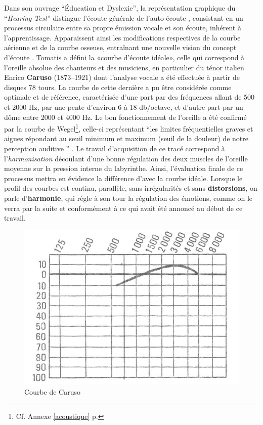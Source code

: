 Dans son ouvrage ``Éducation et
    Dyslexie''\autocite {tomatis:education}, la représentation graphique du
 ``\emph {Hearing Test}'' distingue l'écoute générale de
 l'auto-écoute \autocite {Tomatislangage}, consistant  en un processus
   circulaire entre sa propre  émission vocale et son écoute, inhérent
   à l'apprentissage.
 Apparaissent ainsi les modifications respectives
 de la courbe aérienne et de la courbe osseuse, entraînant une nouvelle vision
 du concept d'écoute \autocite {tomatis_conf}.%
       Tomatis a défini la «courbe d'écoute idéale», celle qui correspond à l'oreille absolue
des chanteurs et des musiciens, en particulier du ténor italien Enrico
\textbf{Caruso} (1873--1921) dont l'analyse vocale a été effectuée à partir de
disques 78 tours. La courbe de cette dernière a pu être considérée comme
optimale et de référence, caractérisée d'une part par des fréquences allant de 500 et 2000
Hz, par une pente d\textquoteright environ 6 à 18 db/octave,
et d'autre part par un dôme entre 2000 et 4000 Hz.
Le bon fonctionnement de l'oreille a été confirmé par la courbe
de Wegel\footnote{Cf. Annexe \ref{acoustique} p. \pageref{acoustique}}, celle-ci représentant   \enquote 
{les limites fréquentielles graves et 
aigues répondant au seuil 
minimum et maximum (seuil de la douleur) de notre perception auditive } 
\autocite{Tomatislangage}.
 Le travail d'acquisition de ce tracé correspond à l'\textsl{harmonisation}
découlant d'une bonne régulation des deux muscles de l'oreille moyenne
sur la pression interne du
labyrinthe.
Ainsi, l'évaluation finale de ce processus mettra en évidence la différence
d'avec la courbe idéale.
Lorsque le profil des
courbes est continu, parallèle, sans irrégularités et sans
\textbf{distorsions}, on parle d'\textbf{harmonie}, qui règle à son tour
la régulation des émotions, comme on le verra par la suite et conformément à
ce qui avait été annoncé au début de ce travail.
\begin{center}
	\begin{figure}
		\includegraphics[width=0.9\linewidth]{images/graphiques/courbecarusoideale}	
		\caption{Courbe de Caruso}
	\end{figure}	
\end{center}
